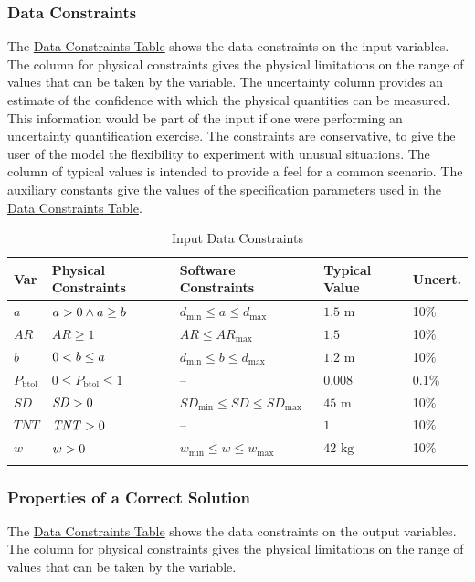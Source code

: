 \documentclass[12pt]{article}
\newcommand{\gt}{\ensuremath >}
\newcommand{\lt}{\ensuremath <}
\begin{document}
\subsubsection{Data Constraints}
\label{Sec:DataConstraints}
The \hyperref[Table:InDataConstraints]{Data Constraints Table} shows the data constraints on the input variables. The column for physical constraints gives the physical limitations on the range of values that can be taken by the variable. The uncertainty column provides an estimate of the confidence with which the physical quantities can be measured. This information would be part of the input if one were performing an uncertainty quantification exercise. The constraints are conservative, to give the user of the model the flexibility to experiment with unusual situations. The column of typical values is intended to provide a feel for a common scenario. The \hyperref[Sec:AuxConstants]{auxiliary constants} give the values of the specification parameters used in the \hyperref[Table:InDataConstraints]{Data Constraints Table}.

\begin{longtable}{l l l l l}
\toprule
\textbf{Var} & \textbf{Physical Constraints} & \textbf{Software Constraints} & \textbf{Typical Value} & \textbf{Uncert.}
\\
\midrule
\endhead
$a$ & $a\gt{}0\land{}a\geq{}b$ & ${d_{\text{min}}}\leq{}a\leq{}{d_{\text{max}}}$ & $1.5$ ${\text{m}}$ & 10$\%$
\\
$\mathit{AR}$ & $\mathit{AR}\geq{}1$ & $\mathit{AR}\leq{}{\mathit{AR}_{\text{max}}}$ & $1.5$ & 10$\%$
\\
$b$ & $0\lt{}b\leq{}a$ & ${d_{\text{min}}}\leq{}b\leq{}{d_{\text{max}}}$ & $1.2$ ${\text{m}}$ & 10$\%$
\\
${P_{\text{b}\text{tol}}}$ & $0\leq{}{P_{\text{b}\text{tol}}}\leq{}1$ & -- & $0.008$ & 0.1$\%$
\\
$\mathit{SD}$ & $\mathit{SD}\gt{}0$ & ${\mathit{SD}_{\text{min}}}\leq{}\mathit{SD}\leq{}{\mathit{SD}_{\text{max}}}$ & $45$ ${\text{m}}$ & 10$\%$
\\
$\mathit{TNT}$ & $\mathit{TNT}\gt{}0$ & -- & $1$ & 10$\%$
\\
$w$ & $w\gt{}0$ & ${w_{\text{min}}}\leq{}w\leq{}{w_{\text{max}}}$ & $42$ ${\text{kg}}$ & 10$\%$
\\
\bottomrule
\caption{Input Data Constraints}
\label{Table:InDataConstraints}
\end{longtable}
\subsubsection{Properties of a Correct Solution}
\label{Sec:CorSolProps}
The \hyperref[Table:OutDataConstraints]{Data Constraints Table} shows the data constraints on the output variables. The column for physical constraints gives the physical limitations on the range of values that can be taken by the variable.
\end{document}
